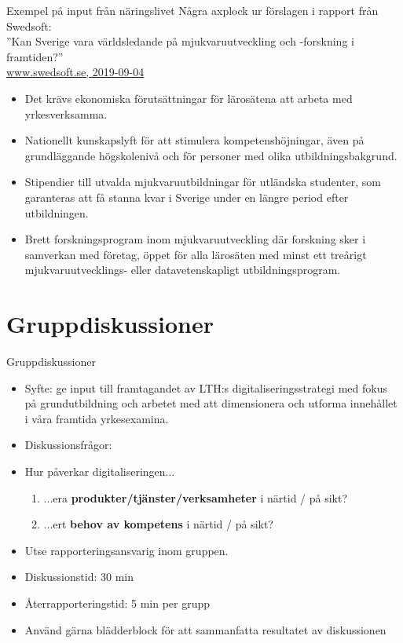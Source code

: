 \documentclass[aspectratio=169]{beamer}
\newenvironment{Slide}[1]%
  {\begin{frame}[environment=Slide]{#1}}
  {\end{frame}}%
\begin{document}
\begin{Slide}{Exempel på input från näringslivet}
  Några axplock ur förslagen i rapport från Swedsoft: \\''Kan Sverige vara världsledande på mjukvaruutveckling och -forskning i framtiden?''\\
  \href{https://www.swedsoft.se/wp-content/uploads/sites/7/2019/09/Swedsoft-Helhetssyn-p\%C3\%A5-mjukvarans-betydelse-f\%C3\%B6r-digitalisering-och-konkurrenskraft.pdf}{www.swedsoft.se, 2019-09-04}
\begin{itemize}
  \item Det krävs ekonomiska förutsättningar för lärosätena att arbeta med yrkesverksamma.
  \item Nationellt kunskapslyft för att stimulera kompetenshöjningar, även på grundläggande högskolenivå och för personer med olika utbildningsbakgrund.
  \item Stipendier till utvalda mjukvaruutbildningar för utländska studenter, som garanteras att få stanna kvar i Sverige under en längre period efter utbildningen.
  \item Brett forskningsprogram inom mjukvaruutveckling där forskning sker i samverkan med företag, öppet för alla lärosäten med minst ett treårigt mjukvaruutvecklings- eller datavetenskapligt utbildningsprogram.
\end{itemize}
\end{Slide}




\section{Gruppdiskussioner}

\begin{Slide}{Gruppdiskussioner}
  \begin{itemize}
    \item Syfte: ge input till framtagandet av LTH:s digitaliseringsstrategi med fokus på grundutbildning och arbetet med att dimensionera och utforma innehållet i våra framtida yrkesexamina.
    \item Diskussionsfrågor: \\ 
    \item[] Hur påverkar digitaliseringen...

    \begin{enumerate}
        \item  ...era \textbf{produkter/tjänster/verksamheter} i
        närtid / på sikt?
        
        \item ...ert \textbf{behov av kompetens} i närtid / på
        sikt?
    \end{enumerate}

    \item Utse rapporteringsansvarig inom gruppen.
    \item Diskussionstid: 30 min
    \item Återrapporteringstid: 5 min per grupp
    \item Använd gärna blädderblock för att sammanfatta resultatet av diskussionen 
  \end{itemize}
\end{Slide}
\end{document}
